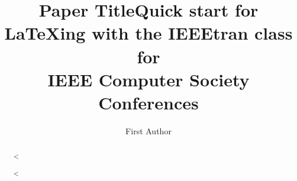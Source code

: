 {{\begin{abstract}
<%
\title{Paper Title}
\author{First Author}

\begin{abstract}
<%

\title{Quick start for LaTeXing with the IEEEtran class for\\ IEEE Computer Society Conferences}

\author{%
  \and
}


\maketitle


%
%

\end{abstract}
\end{abstract}}}
